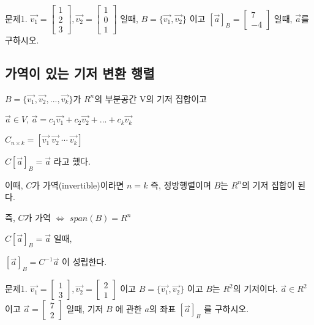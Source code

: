 \newpage
문제1. $\vec{v_1} = \begin{bmatrix}1 \\ 2 \\ 3 \end{bmatrix}, \vec{v_2} = \begin{bmatrix}1 \\ 0 \\ 1 \end{bmatrix}$ 일때, $B = \{\vec{v_1}, \vec{v_2} \}$ 이고 $[\vec{a}]_B = \begin{bmatrix} 7 \\ -4 \end{bmatrix}$ 일때, $\vec{a}$를 구하시오.



\newpage
\subsection{가역이 있는 기저 변환 행렬}
\begin{theorem}
$B = \{\vec{v_1}, \vec{v_2}, ..., \vec{v_k}\}$가 $R^n$의 부분공간 V의 기저 집합이고

${\vec{a}} \in V$,  $\vec{a} = c_1\vec{v_1}+ c_2\vec{v_2} +... + c_k\vec{v_k}$ 

$C_{n \times k} = [\vec{v_1} \ \vec{v_2} \ \cdots \ \vec{v_k} ]$

$C[\vec{a}]_B = \vec{a}$ 라고 했다.

이때, $C$가 가역(invertible)이라면 $n=k$ 즉, 정방행렬이며 $B$는 $R^n$의 기저 집합이 된다.

즉, $C$가 가역 $\iff$ $span(B) = R^n$

$ C[\vec{a}]_B = \vec{a}$ 일때,

$ [\vec{a}]_B = C^{-1}\vec{a}$ 이 성립한다.
\end{theorem}


\newpage
문제1. $\vec{v_1} = \begin{bmatrix} 1 \\ 3 \end{bmatrix}, \vec{v_2} = \begin{bmatrix} 2 \\ 1 \end{bmatrix}$ 이고 $B = \{ \vec{v_1}, \vec{v_2} \}$ 이고 $B$는 $R^2$의 기저이다. $\vec{a} \in R^2$ 이고 $\vec{a} = \begin{bmatrix} 7 \\ 2 \end{bmatrix}$ 일때, 기저 $B$ 에 관한 $a$의 좌표 $[\vec{a}]_B$ 를 구하시오.

